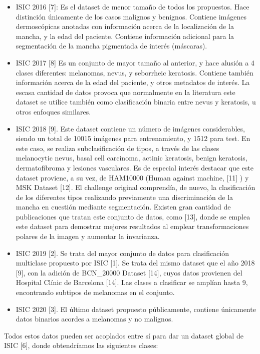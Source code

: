 \begin{itemize}
	
	\item ISIC 2016 [7]:  Es el dataset de menor tamaño de todos los propuestos. Hace distinción únicamente de los casos malignos y benignos. Contiene imágenes dermoscópicas anotadas con información acerca de la localización de la mancha, y la edad del paciente. Contiene información adicional para la segmentación de la mancha pigmentada de interés (máscaras).
	\item ISIC 2017 [8] Es un conjunto de mayor tamaño al anterior, y hace alusión a 4 clases diferentes: melanomas, nevus, y seborrheic keratosis. Contiene también información acerca de la edad del paciente, y otros metadatos de interés. La escasa cantidad de datos provoca que normalmente en la literatura este dataset se utilice también como clasificación binaria entre nevus y keratosis, u otros enfoques similares. 
	\item ISIC 2018 [9]. Este dataset contiene un número de imágenes considerables, siendo un total de 10015 imágenes para entrenamiento, y 1512 para test. En este caso, se realiza subclasificación de tipos, a través de las clases melanocytic nevus, basal cell carcinoma, actinic keratosis, benign keratosis, dermatofibroma y lesiones vasculares. Es de especial interés destacar que este dataset proviene, a su vez, de HAM10000 (Human against machine, [11] )  y MSK Dataset [12]. El challenge original comprendía, de nuevo, la clasificación de los diferentes tipos realizando previamente una discriminación de la mancha en cuestión mediante segmentación. Existen gran cantidad de publicaciones que tratan este conjunto de datos, como [13], donde se emplea este dataset para demostrar mejores resultados al emplear transformaciones polares de la imagen y aumentar la invarianza.
	
	\item ISIC 2019 [2].  Se trata del mayor conjunto de datos para clasificación multiclase propuesto por ISIC [1]. Se trata del mismo dataset que el año 2018 [9], con la adición de BCN\_20000 Dataset [14], cuyos datos provienen del Hospital Clínic de Barcelona [14]. Las clases a clasificar se amplían hasta 9, encontrando subtipos de melanomas en el conjunto.
	\item ISIC 2020 [3]. El último dataset propuesto públicamente, contiene únicamente datos binarios acordes a melanomas y no malignos. 
\end{itemize}

Todos estos datos pueden ser acoplados entre sí para dar un dataset global de ISIC [6], donde obtendríamos las siguientes clases: 


